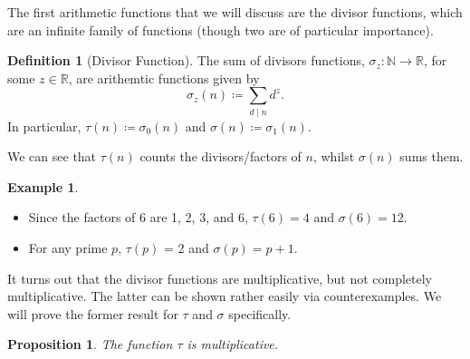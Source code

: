 \documentclass[a4paper]{article}
\newtheorem{proposition}[theorem]{Proposition}
\theoremstyle{definition}
\newtheorem{definition}{Definition}
\newtheorem*{example}{Example}
\begin{document}
The first arithmetic functions that we will discuss are the divisor functions, which are an infinite family of functions (though two are of particular importance).
\begin{definition}[Divisor Function]
    The sum of divisors functions, $\sigma_z\colon \mathbb{N} \to \mathbb{R}$, for some $z \in \mathbb{R}$, are arithemtic functions given by
    \begin{equation}
        \sigma_z(n) \coloneq \sum_{d \mid n} d^z.
    \end{equation}
    In particular, $\tau(n) \coloneq \sigma_0(n)$ and $\sigma(n) \coloneq \sigma_1(n)$.
\end{definition}
We can see that $\tau(n)$ counts the divisors/factors of $n$, whilst $\sigma(n)$ sums them.
\begin{example} \leavevmode
    \begin{itemize}
        \item Since the factors of 6 are 1, 2, 3, and 6, $\tau(6) = 4$ and $\sigma(6) = 12$.
        \item For any prime $p$, $\tau(p)$ = 2 and $\sigma(p) = p + 1$.
    \end{itemize}
\end{example}
It turns out that the divisor functions are multiplicative, but not completely multiplicative.
The latter can be shown rather easily via counterexamples.
We will prove the former result for $\tau$ and $\sigma$ specifically.
\begin{proposition} \label{thm:tau multiplicative}
    The function $\tau$ is multiplicative.
\end{proposition}
\end{document}
